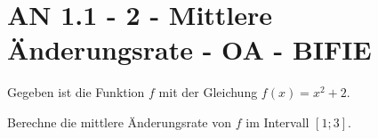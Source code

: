 \section{AN 1.1 - 2 - Mittlere Änderungsrate - OA - BIFIE}

\begin{beispiel}[AN 1.1]{1} %
Gegeben ist die Funktion $f$ mit der Gleichung $f(x)=x^2+2$.

Berechne die mittlere Änderungsrate von $f$ im Intervall $[1;3]$.

\end{beispiel}